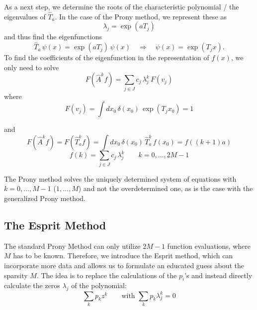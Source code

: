 As a next step, we determine the roots of the characteristic polynomial / the eigenvalues of $\hat{T}_a$. In the case of the Prony method, we represent these as
\begin{equation*}
    \lambda_j = \exp(aT_j)
\end{equation*}
and thus find the eigenfunctions
\begin{equation*}
    \hat{T}_a\, \psi(x) = \exp(aT_j)\, \psi(x) \quad \Rightarrow \quad \psi(x) = \exp(T_j x).
\end{equation*}
To find the coefficients of the eigenfunction in the representation of $f(x)$, we only need to solve
\begin{equation*}
    F(\hat{A}^k f) = \sum_{j \in J} c_j\, \lambda_j^{k}\, F(v_j)
\end{equation*}
where
\begin{equation*}
    F(v_j) = \int dx_0\, \delta(x_0)\, \exp(T_j x_0) = 1
\end{equation*}

and
\begin{equation*}
    F(\hat{A}^k f) = F(\hat{T}_a^k f) = \int dx_0\, \delta(x_0)\, \hat{T}_a^k\, f(x_0) = f((k+1)a)
\end{equation*}
\begin{equation*}
    f(k) = \sum_{j \in J} c_j\, \lambda_j^{k} \qquad k = 0, \dots, 2M-1
\end{equation*}

The Prony method solves the uniquely determined system of equations with $k = 0, \dots, M-1$ ($1, \dots, M$) and not the overdetermined one, as is the case with the generalized Prony method.

\subsection{The Esprit Method}

The standard Prony Method can only utilize $2M-1$ function evaluations, where $M$ has to be known.
Therefore, we introduce the Esprit method, which can incorporate more data and allows us to formulate an educated 
guess about the sparsity $M$.
The idea is to replace the calculations of the $p_i$'s and instead directly calculate the zeros $\lambda_j$ of the polynomial:
\begin{equation*}
    \sum_k p_k z^k \qquad \text{with } \sum_k p_k \lambda_j^k = 0
\end{equation*}

